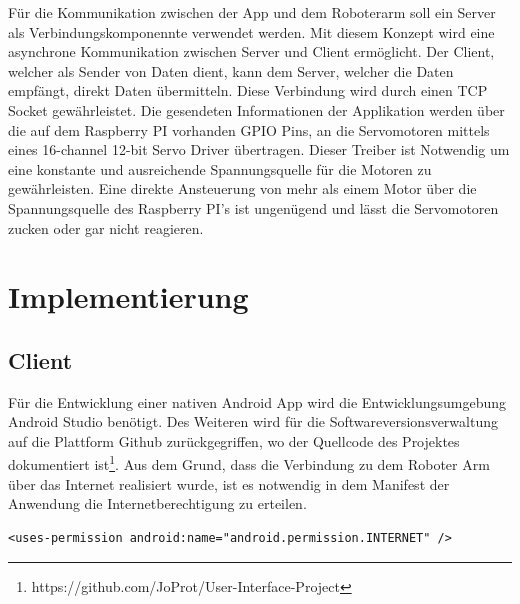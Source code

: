 \documentclass[12pt,					%
							 oneside,			%
							 a4paper,			%
							 halfparskip,		%
							 liststotoc,			%
							 bibtotoc,			%
							 fleqn,				%
							 pointlessnumbers]	%
							 {scrreprt}
\begin{document}

Für die Kommunikation zwischen der App und dem \glqq{}Roboterarm\grqq{} soll ein Server als Verbindungskomponennte verwendet werden. Mit diesem Konzept wird eine asynchrone Kommunikation zwischen Server und Client ermöglicht. Der Client, welcher als Sender von Daten dient, kann dem Server, welcher die Daten empfängt, direkt Daten übermitteln. Diese Verbindung wird durch einen TCP Socket gewährleistet. Die gesendeten Informationen der Applikation werden über die auf dem Raspberry PI vorhanden GPIO Pins, an die Servomotoren mittels eines  \glqq{}16-channel 12-bit Servo Driver\grqq{} übertragen. Dieser Treiber ist Notwendig um eine konstante und ausreichende Spannungsquelle für die Motoren zu gewährleisten. Eine direkte Ansteuerung von mehr als einem Motor über die Spannungsquelle des Raspberry PI's ist ungenügend und lässt die Servomotoren zucken oder gar nicht reagieren.


\chapter{Implementierung}	
\section{Client}
Für die Entwicklung einer nativen Android App wird die Entwicklungsumgebung Android Studio benötigt. Des Weiteren wird für die Softwareversionsverwaltung auf die Plattform Github zurückgegriffen, wo der Quellcode des Projektes dokumentiert ist\footnote{https://github.com/JoProt/User-Interface-Project}. Aus dem Grund, dass die Verbindung zu dem Roboter Arm über das Internet realisiert wurde, ist es notwendig in dem Manifest der Anwendung die Internetberechtigung zu erteilen. \\
\begin{lstlisting}
<uses-permission android:name="android.permission.INTERNET" />
\end{lstlisting}
\end{document}
